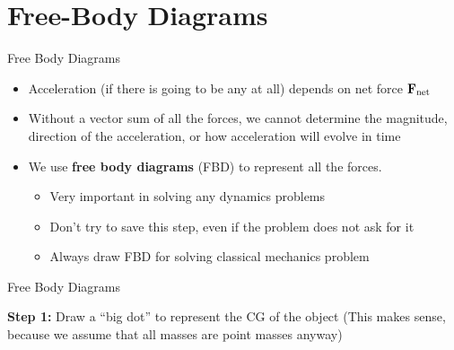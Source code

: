 \documentclass[12pt,compress,aspectratio=169]{beamer}
\newcommand{\mb}[1]{\ensuremath\mathbf{#1}}
\begin{document}
\section{Free-Body Diagrams}


\begin{frame}{Free Body Diagrams}
  \begin{itemize}
  \item Acceleration (if there is going to be any at all) depends
    on net force $\mb{F}_\mathrm{net}$
  \item Without a vector sum of all the forces, we cannot determine the
    magnitude, direction of the acceleration, or how acceleration will evolve
    in time
  \item We use \textbf{free body diagrams} (FBD) to represent all the forces.
    \begin{itemize}
    \item Very important in solving any dynamics problems
    \item Don't try to save this step, even if the problem does not ask for it
    \item Always draw FBD for solving classical mechanics problem
    \end{itemize}
  \end{itemize}
\end{frame}



\begin{frame}{Free Body Diagrams}

  \textbf{Step 1:} Draw a ``big dot'' to represent the CG of the
  object (This makes sense, because we assume that all masses are point masses
  anyway)

  \begin{center}
  \end{center}

\end{frame}
\end{document}
